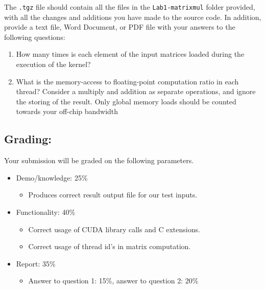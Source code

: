 \documentclass[11pt,oneside]{article}
\def\mybibliostyle{plain}
\def\mybibliocommand{}
\begin{document}
\begin{enumerate}
The \texttt{.tgz} file should contain all the files in the \texttt{Lab1-matrixmul} folder provided, with all the changes and additions you have made to the source code.  In addition, provide a text file, Word Document, or PDF file with your answers to the following questions:

\begin{enumerate}

\item How many times is each element of the input matrices loaded during the execution of the kernel?


\item What is the memory-access to floating-point computation ratio in each thread?  Consider a multiply and addition as separate operations, and ignore the storing of the result.  Only global memory loads should be counted towards your off-chip bandwidth


\end{enumerate}


\end{enumerate}

\subsection{Grading:}
\label{grading:}

Your submission will be graded on the following parameters.  

\begin{itemize}

\item Demo/knowledge: 25\%

\begin{itemize}

\item Produces correct result output file for our test inputs.
\end{itemize}


\item Functionality:  40\%

\begin{itemize}

\item Correct usage of CUDA library calls and C extensions.
\item Correct usage of thread id's in matrix computation.
\end{itemize}


\item Report: 35\%

\begin{itemize}

\item Answer to question 1: 15\%, answer to question 2: 20\%
\end{itemize}


\end{itemize}


\mybibliocommand
\end{document}
